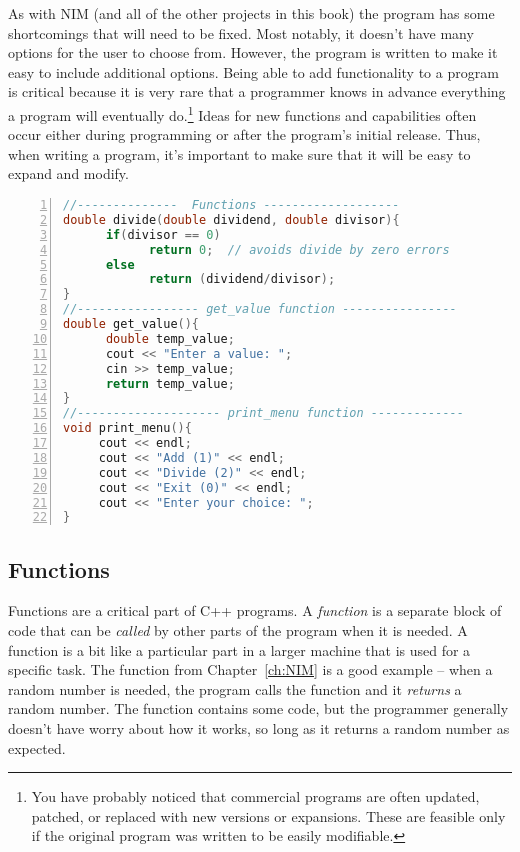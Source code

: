 As with NIM (and all of the other projects in this book) the program has some shortcomings that will need to be fixed.  Most notably, it doesn't have  many options for the user to choose from.  However, the program is written to make it easy to include additional options.  Being able to add functionality to a program is critical because it is very rare that a programmer knows in advance everything a program will eventually do.\footnote{You have probably noticed that commercial programs are often updated, patched, or replaced with new versions or expansions.  These are feasible only if the original program was written to be easily modifiable.}  Ideas for new functions and capabilities often occur either during programming or after the program's initial release.  Thus, when writing a program, it's important to make sure that it will be easy to expand and modify.

\begin{minipage}{\textwidth}
\renewcommand*\thelstnumber{\the\value{lstnumber}b}
\begin{lstlisting}[language=C++,numbers = left, xleftmargin=4.0ex, basicstyle=\small,emph={dividend, divisor,temp_value},emphstyle = \color{\mycolor},
showstringspaces=false,
caption = {The code for the functions that are used in the calculator program.  The lines are numbered followed by a \emph{`b'} for easy reference in the text.},
label={listing:calcFunctions}]
//--------------  Functions -------------------
double divide(double dividend, double divisor){
      if(divisor == 0)
            return 0;  // avoids divide by zero errors
      else
            return (dividend/divisor);
}
//----------------- get_value function ----------------
double get_value(){
      double temp_value;
      cout << "Enter a value: ";
      cin >> temp_value;
      return temp_value;
}
//-------------------- print_menu function -------------
void print_menu(){
     cout << endl;
     cout << "Add (1)" << endl;
     cout << "Divide (2)" << endl;
     cout << "Exit (0)" << endl;
     cout << "Enter your choice: ";
}
\end{lstlisting}
\end{minipage}


\subsection{Functions}

Functions are a critical part of C++ programs.  A \emph{function} is a separate block of code that can be \emph{called} by other parts of the program when it is needed.  A function is a bit like a particular part in a larger machine that is used for a specific task.  The  function from Chapter~\ref{ch:NIM} is a good example -- when a random number is needed, the program calls the  function and it \emph{returns} a random number.  The  function contains some code, but the programmer generally doesn't have worry about how it works, so long as it returns a random number as expected.

